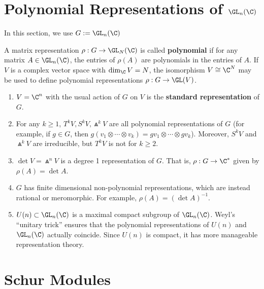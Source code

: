 \section{\texorpdfstring{Polynomial Representations of $\GL_n(\C)$}{Polynomial Representations of GLn(C)}}

In this section, we use $G:= \GL_n(\C)$

\begin{defn}
    A matrix representation $\rho: G \to \GL_N(\C)$ is called \textbf{polynomial} if for any matrix $A \in \GL_n(\C)$, the entries of $\rho(A)$ are polynomials in the entries of $A$. If $V$ is a complex vector space with $\dim_\C V=N$, the isomorphism $V \cong \C^N$ may be used to define polynomial representations $\rho:G \to \GL(V)$.
\end{defn}

\begin{ex}
    \begin{enumerate}
        \item $V=\C^n$ with the usual action of $G$ on $V$ is the \textbf{standard representation} of $G$.
        \item For any $k \geq 1$, $T^kV,S^kV,\Wedge^kV$ are all polynomial representations of $G$ (for example, if $g \in G$, then $g(v_1\otimes \cdots \otimes v_k)=gv_1\otimes \cdots \otimes gv_k$). Moreover, $S^kV$ and $\Wedge ^kV$ are irreducible, but $T^kV$ is not for $k \geq 2$.
        \item $\det V = \Wedge^nV$ is a degree 1 representation of $G$. That is, $\rho:G \to \C^*$ given by $\rho(A) = \det A$.
        \item $G$ has finite dimensional non-polynomial representations, which are instead rational or meromorphic. For example, $\rho (A)=(\det A)^{-1}$.
        \item $U(n) \subset \GL_n(\C)$ is a maximal compact subgroup of $\GL_n(\C)$. Weyl's ``unitary trick'' ensures that the polynomial representations of $U(n)$ and $\GL_n(\C)$ actually coincide. Since $U(n)$ is compact, it has more manageable representation theory.
    \end{enumerate}
\end{ex}

\section{Schur Modules}

